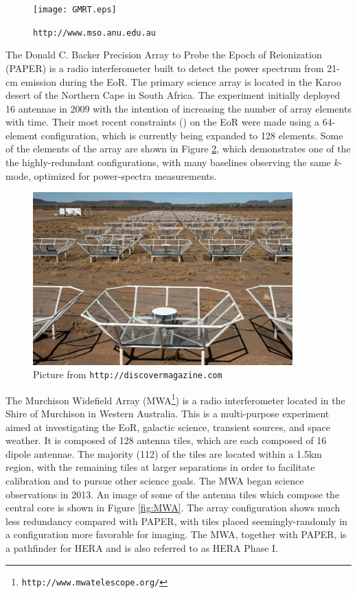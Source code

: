 \begin{figure}[h]
  \centering
  \texttt{[image: GMRT.eps]}
  \caption{{\tt http://www.mso.anu.edu.au}}
  \label{fig:GMRT}
\end{figure}


The Donald C. Backer Precision Array to Probe the Epoch of Reionization (PAPER) is a radio interferometer built to detect the power spectrum from 21-cm emission during the EoR. The primary science array is located in the Karoo desert of the Northern Cape in South Africa. The experiment initially deployed 16 antennae in 2009 with the intention of increasing the number of array elements with time. Their most recent constraints (\citealt{pober2015paper}) on the EoR were made using a 64-element configuration, which is currently being expanded to 128 elements. Some of the elements of the array are shown in Figure \ref{fig:PAPER}, which demonstrates one of the the highly-redundant configurations, with many baselines observing the same $k$-mode, optimized for power-spectra measurements.

\begin{figure}[h]
  \centering
  \includegraphics[width=10cm]{PAPER.eps}
  \caption{Picture from {\tt http://discovermagazine.com}}
  \label{fig:PAPER}
\end{figure}


The Murchison Widefield Array (MWA\footnote{{\tt http://www.mwatelescope.org/}}) is a radio interferometer located in the Shire of Murchison in Western Australia. This is a multi-purpose experiment aimed at investigating the EoR, galactic science, transient sources, and space weather. It is composed of 128 antenna tiles, which are each composed of 16 dipole antennae. The majority (112) of the tiles are located within a 1.5km region, with the remaining tiles at larger separations in order to facilitate calibration and to pursue other science goals. The MWA began science observations in 2013. An image of some of the antenna tiles which compose the central core is shown in Figure \ref{fig:MWA}. The array configuration shows much less redundancy compared with PAPER, with tiles placed seemingly-randomly in a configuration more favorable for imaging. The MWA, together with PAPER, is a pathfinder for HERA and is also referred to as HERA Phase I. 

